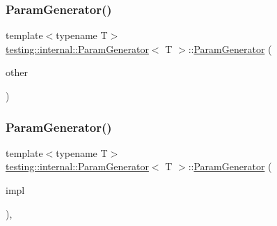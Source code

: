 \subsubsection{\texorpdfstring{ParamGenerator()}{ParamGenerator()}\hspace{0.1cm}{\footnotesize\ttfamily [2/6]}}
{\footnotesize\ttfamily template$<$typename T$>$ \\
\mbox{\hyperlink{classtesting_1_1internal_1_1_param_generator}{testing\+::internal\+::\+Param\+Generator}}$<$ T $>$\+::\mbox{\hyperlink{classtesting_1_1internal_1_1_param_generator}{Param\+Generator}} (\begin{DoxyParamCaption}\item[{const \mbox{\hyperlink{classtesting_1_1internal_1_1_param_generator}{Param\+Generator}}$<$ T $>$ \&}]{other }\end{DoxyParamCaption})\hspace{0.3cm}{\ttfamily [inline]}}

\mbox{\label{classtesting_1_1internal_1_1_param_generator_a6b017d4d030927714d495ee95ae92fbc}} 
\subsubsection{\texorpdfstring{ParamGenerator()}{ParamGenerator()}\hspace{0.1cm}{\footnotesize\ttfamily [3/6]}}
{\footnotesize\ttfamily template$<$typename T$>$ \\
\mbox{\hyperlink{classtesting_1_1internal_1_1_param_generator}{testing\+::internal\+::\+Param\+Generator}}$<$ T $>$\+::\mbox{\hyperlink{classtesting_1_1internal_1_1_param_generator}{Param\+Generator}} (\begin{DoxyParamCaption}\item[{\mbox{\hyperlink{classtesting_1_1internal_1_1_param_generator_interface}{Param\+Generator\+Interface}}$<$ T $>$ $\ast$}]{impl }\end{DoxyParamCaption})\hspace{0.3cm}{\ttfamily [inline]}, {\ttfamily [explicit]}}

\mbox{\label{classtesting_1_1internal_1_1_param_generator_a5891d25c31919b3099489f8bbcd58b5e}} 
